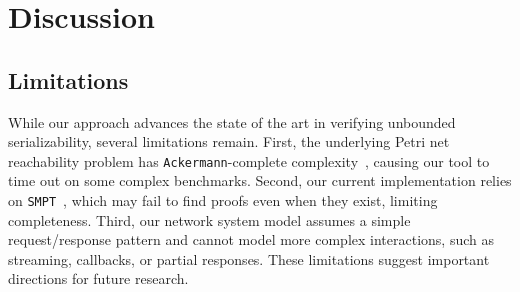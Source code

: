 

\section{Discussion}
\label{sec:discussion}



%




\subsection{Limitations}
While our approach advances the state of the art in verifying unbounded serializability, several limitations remain.
First, the underlying Petri net reachability problem has \texttt{Ackermann}-complete complexity~\cite{CzWo22}, causing our tool to time out on some complex benchmarks. %
Second, our current implementation relies on \texttt{SMPT}~\cite{AmDa23}, which may fail to find proofs even when they exist, limiting completeness.
Third, our network system model assumes a simple request/response pattern and cannot model more complex interactions, such as streaming, callbacks, or partial responses.
These limitations suggest important directions for future research.

